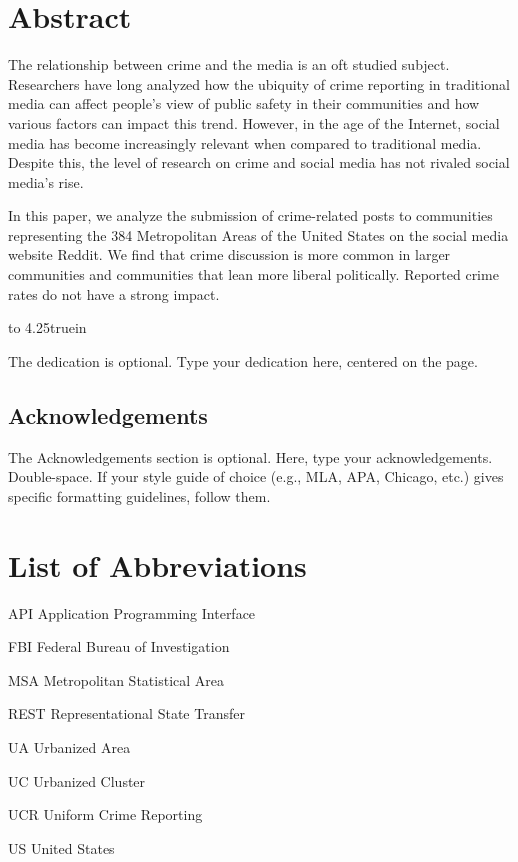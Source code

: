 \documentclass[12pt,oneside, letterpaper]{book}
\begin{document}
\chapter*{Abstract}
\par The relationship between crime and the media is an oft studied subject. Researchers have long analyzed how the ubiquity of crime reporting in traditional media can affect people's view of public safety in their communities and how various factors can impact this trend. However, in the age of the Internet, social media has become increasingly relevant when compared to traditional media. Despite this, the level of research on crime and social media has not rivaled social media's rise.
\par In this paper, we analyze the submission of crime-related posts to communities representing the 384 Metropolitan Areas of the United States on the social media website Reddit. We find that crime discussion is more common in larger communities and communities that lean more liberal politically. Reported crime rates do not have a strong impact.

\newpage

\vbox to 4.25truein{}
\centerline{The dedication is optional. Type your dedication here, centered on the page.}

\newpage
\begin{doublespace}
\chapter*{Acknowledgements}
\par The Acknowledgements section is optional. Here, type your acknowledgements. Double-space. If your style guide of choice (e.g., MLA, APA, Chicago, etc.) gives specific formatting guidelines, follow them.
\end{doublespace}

\newpage

\tableofcontents
\listoftables
{}

\listoffigures
{}

\chapter*{List of Abbreviations}

\begin{doublespace}

API  Application Programming Interface

FBI  Federal Bureau of Investigation

MSA  Metropolitan Statistical Area

REST Representational State Transfer

UA  Urbanized Area

UC  Urbanized Cluster

UCR  Uniform Crime Reporting

US  United States

\end{doublespace}
\end{document}
